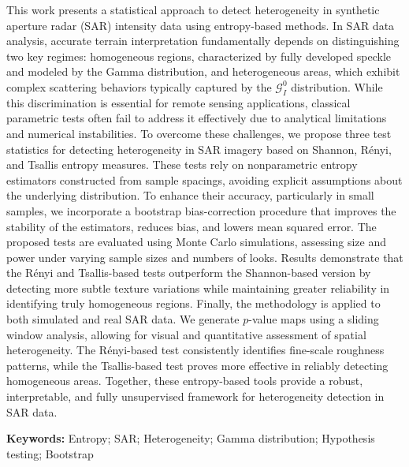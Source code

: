 
This work presents a statistical approach to detect heterogeneity 
in synthetic aperture radar (SAR) intensity data using entropy-based methods.
In SAR data analysis, accurate terrain interpretation fundamentally depends 
on distinguishing two key regimes: homogeneous regions, characterized by fully 
developed speckle and modeled by the Gamma distribution, and heterogeneous areas, 
which exhibit complex scattering behaviors typically captured by the $\mathcal{G}_I^0$ distribution.
While this discrimination is essential for remote sensing applications, classical parametric tests often fail to address it 
effectively due to analytical limitations and numerical instabilities.
To overcome these challenges, we propose three test statistics for detecting heterogeneity 
in SAR imagery based on Shannon, Rényi, and Tsallis entropy measures. These tests rely on 
nonparametric entropy estimators constructed from sample spacings, avoiding explicit assumptions 
about the underlying distribution. To enhance their accuracy, particularly in small samples, 
we incorporate a bootstrap bias-correction procedure that improves the stability of the estimators, 
reduces bias, and lowers mean squared error.
The proposed tests are evaluated using Monte Carlo simulations, assessing size and power 
under varying sample sizes and numbers of looks.
Results demonstrate that the Rényi and Tsallis-based tests outperform the Shannon-based version by 
detecting more subtle texture variations while maintaining greater reliability in identifying 
truly homogeneous regions.
Finally, the methodology is applied to both simulated and real SAR data. We generate $p$-value maps using a 
sliding window analysis, allowing for visual and quantitative assessment of spatial heterogeneity. 
The Rényi-based test consistently identifies fine-scale roughness patterns, while the Tsallis-based 
test proves more effective in reliably detecting homogeneous areas. Together, these entropy-based 
tools provide a robust, interpretable, and fully unsupervised framework for heterogeneity detection 
in SAR data.

\vspace{1em}
\par
\noindent \textbf{Keywords:}  Entropy; SAR; Heterogeneity; Gamma distribution; Hypothesis testing; Bootstrap





